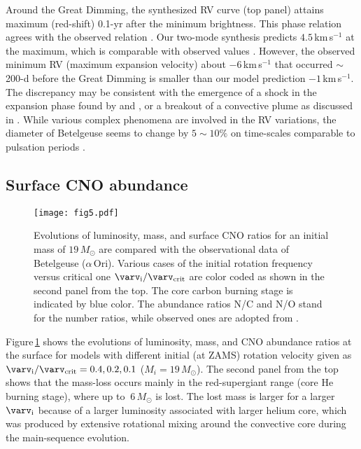 \documentclass[fleqn,usenatbib]{mnras}
\begin{document}
Around the Great Dimming, the synthesized RV curve 
(top panel) attains maximum (red-shift) 0.1-yr after the minimum brightness.
This phase relation agrees with the observed relation \citep{Dupree2022,MacLeod2023}.
Our two-mode synthesis predicts $4.5$\,km\,s$^{-1}$ at the maximum, which is
comparable with observed values \citep{Kravchenko2021,Dupree2022}.
However, the observed minimum RV (maximum expansion velocity) 
about $-6$\,km\,s$^{-1}$ that occurred $\sim$200-d before the Great Dimming 
is smaller than our model prediction $-1$\,km\,s$^{-1}$.
The discrepancy may be consistent with the emergence of a shock 
in the expansion phase found by \citet{Kravchenko2021} and \citet{Dupree2022},
or a breakout of a convective plume as discussed in \citet{MacLeod2023}. 
While various complex phenomena are involved in the RV variations,
the diameter of Betelgeuse seems to change by $5\sim10\%$ on time-scales comparable
to pulsation periods \citep{Townes2009,Taniguchi2022}. 
 
  
\subsection{Surface CNO abundance}  

\begin{figure}
\texttt{[image: fig5.pdf]}  %
\caption{Evolutions of luminosity, mass, and surface CNO ratios 
for an initial mass of $19\,M_\odot$ are compared with the observational data
of Betelgeuse ($\alpha$\,Ori). 
Various cases of the initial rotation frequency versus critical one 
$\varv_{\rm i}/\varv_{\rm crit}$ are color coded as shown 
in the second panel from the top.
The core carbon burning stage is indicated by blue color.
The abundance ratios N/C and N/O stand for the number ratios, while observed 
ones are adopted from \citet{Carr2000}. }
\label{fig:cno}
\end{figure}

Figure\,\ref{fig:cno} shows the evolutions of luminosity, mass, 
and CNO abundance ratios at the surface for 
models with different initial (at ZAMS) rotation velocity given as 
$\varv_{\rm i}/\varv_{\rm crit}=0.4,0.2,0.1$ ($M_i=19\,M_\odot$).
The second panel from the top shows that the mass-loss occurs mainly in the
red-supergiant range (core He burning stage), where up to $~6\,M_\odot$ is lost.
The lost mass is larger for a larger $\varv_{\rm i}$ because of 
a larger luminosity associated with larger helium core, which was 
produced by extensive rotational mixing around the convective core during the
main-sequence evolution.
\end{document}
